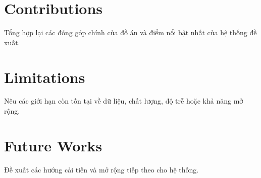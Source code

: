 \documentclass[../DoAn.tex]{subfiles}
\begin{document}
\section{Contributions}
\label{section:6.1}
Tổng hợp lại các đóng góp chính của đồ án và điểm nổi bật nhất của hệ thống đề xuất.

\section{Limitations}
\label{section:6.2}
Nêu các giới hạn còn tồn tại về dữ liệu, chất lượng, độ trễ hoặc khả năng mở rộng.

\section{Future Works}
\label{section:6.3}
Đề xuất các hướng cải tiến và mở rộng tiếp theo cho hệ thống.
\end{document}
